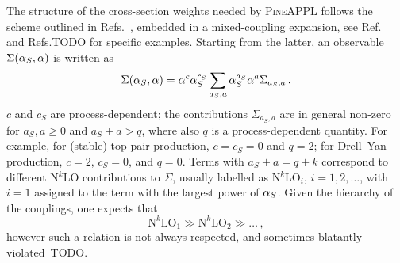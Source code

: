 The structure of the cross-section weights needed by \textsc{PineAPPL} follows the scheme outlined in
Refs.~\cite{Frederix:2011ss, Bertone:2014zva}, embedded in a mixed-coupling expansion, see Ref.~\cite{Frederix:2018nkq} and Refs.TODO for
specific examples. Starting
from the latter, an observable $\Sigma(\alpha_{S}, \alpha)$ is written as
\begin{equation}
    \Sigma(\alpha_{S}, \alpha) = \alpha^c \alpha_{S}^{c_S} \sum_{a_S, a} \alpha_{S}^{a_S} \alpha^a \Sigma_{a_S, a}\,.
\end{equation}
$c$ and $c_S$ are process-dependent; the contributions $\Sigma_{a_S, a}$ are in general non-zero for $a_S, a \ge 0$ and $a_S + a > q$, where also $q$ is a process-dependent
quantity. For example,
for (stable) top-pair production, $c=c_S=0$ and $q=2$; for Drell--Yan production, $c=2$, $c_S=0$, and $q=0$. Terms
with  $a_S + a = q + k$ correspond to different N$^k$LO contributions to $\Sigma$, usually
labelled as N$^k$LO$_i$, $i =1,2, \ldots$, with $i=1$ assigned to the term with the largest power of $\alpha_{S}$. Given the hierarchy of the couplings,
one expects that
\begin{equation}
 \textrm{N}^k\textrm{LO}_1 \gg \textrm{N}^k\textrm{LO}_2 \gg\ldots \, ,
\end{equation}
however such a relation is not always respected, and sometimes blatantly violated~TODO.

